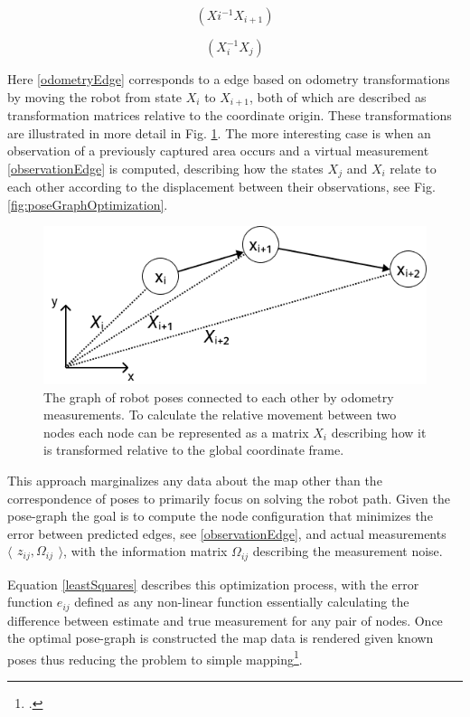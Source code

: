 \begin{equation}\label{odometryEdge}
	(X{i}^{-1}X_{i+1})
\end{equation}

\begin{equation}\label{observationEdge}
	(X_{i}^{-1}X_{j})
\end{equation}

Here \ref{odometryEdge} corresponds to a edge based on odometry transformations by moving the robot from state $X_{i}$ to $X_{i+1}$, both of which are described as transformation matrices relative to the coordinate origin.
These transformations are illustrated in more detail in Fig. \ref{fig:poseGraphTransformation}.
The more interesting case is when an observation of a previously captured area occurs and a virtual measurement \ref{observationEdge} is computed, describing how the states $X_{j}$ and $X_{i}$ relate to each other according to the displacement between their observations, see Fig. \ref{fig:poseGraphOptimization}.

\begin{figure}
	\centering
	\includegraphics[width=0.6\linewidth]{img/PoseGraphTransformation}
	\caption{
		The graph of robot poses connected to each other by odometry measurements. To calculate the relative movement between two nodes each node can be represented as a matrix $X_{i}$ describing how it is transformed relative to the global coordinate frame.
	}
	\label{fig:poseGraphTransformation}
\end{figure}



This approach marginalizes any data about the map other than the correspondence of poses to primarily focus on solving the robot path.  
Given the pose-graph the goal is to compute the node configuration that minimizes the error between predicted edges, see \ref{observationEdge}, and actual measurements 
$
\langle
\begin{matrix}
	z_{ij},  \Omega_{ij}
\end{matrix}
\rangle
$, with the information matrix $\Omega_{ij}$ describing the measurement noise.

Equation \ref{leastSquares} describes this optimization process, with the error function $e_{ij}$ defined as any non-linear function essentially calculating the difference between estimate and true measurement for any pair of nodes. 
Once the optimal pose-graph is constructed the map data is rendered given known poses thus reducing the problem to simple mapping\footcite{grisetti2010graphSLAM}.

